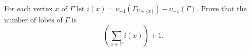 For each vertex $x$ of $\Gamma$ let $i(x) = \nu_{-1}(\Gamma_{V+\{x\}}) - \nu_{-1}(\Gamma)$. Prove that the number of lobes of $\Gamma$ is $$\left(\sum_{x \in V} i(x)\right) + 1.$$